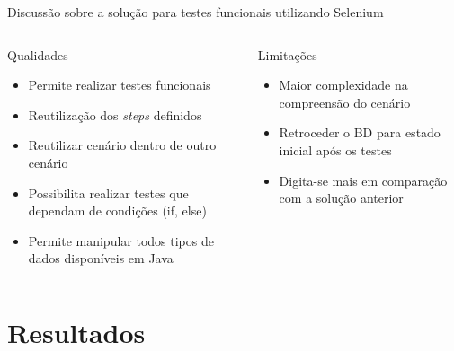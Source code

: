 \documentclass{beamer}
\begin{document}
\begin{frame}{Discussão sobre a solução para testes funcionais utilizando Selenium}
     \begin{columns}[T] %
     \begin{column}[T]{5cm} %
        \begin{block}{Qualidades}
    	    \begin{itemize}
    	        \item Permite realizar testes funcionais
        		\item Reutilização dos \emph{steps} definidos
        		\item Reutilizar cenário dentro de outro cenário
        		\item Possibilita realizar testes que dependam de condições (if, else)
        		\item Permite manipular todos tipos de dados disponíveis em Java
        	\end{itemize}
    	\end{block}
     \end{column}
     \begin{column}[T]{5cm} %
        \begin{alertblock}{Limitações}
            \begin{itemize}
            	\item Maior complexidade na compreensão do cenário
            	\item Retroceder o BD para estado inicial após os testes
            	\item Digita-se mais em comparação com a solução anterior
            \end{itemize}
        \end{alertblock}
     \end{column}
     \end{columns}
\end{frame}

\section{Resultados}
\end{document}
